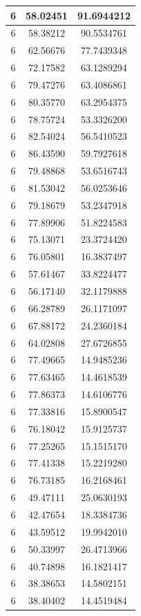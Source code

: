 \documentclass[
]{book}
\begin{document}
\begin{tabular}{c|c|c}
\hline
6 & 58.02451 & 91.6944212\\
\hline
6 & 58.38212 & 90.5534761\\
\hline
6 & 62.56676 & 77.7439348\\
\hline
6 & 72.17582 & 63.1289294\\
\hline
6 & 79.47276 & 63.4086861\\
\hline
6 & 80.35770 & 63.2954375\\
\hline
6 & 78.75724 & 53.3326200\\
\hline
6 & 82.54024 & 56.5410523\\
\hline
6 & 86.43590 & 59.7927618\\
\hline
6 & 79.48868 & 53.6516743\\
\hline
6 & 81.53042 & 56.0253646\\
\hline
6 & 79.18679 & 53.2347918\\
\hline
6 & 77.89906 & 51.8224583\\
\hline
6 & 75.13071 & 23.3724420\\
\hline
6 & 76.05801 & 16.3837497\\
\hline
6 & 57.61467 & 33.8224477\\
\hline
6 & 56.17140 & 32.1179888\\
\hline
6 & 66.28789 & 26.1171097\\
\hline
6 & 67.88172 & 24.2360184\\
\hline
6 & 64.02808 & 27.6726855\\
\hline
6 & 77.49665 & 14.9485236\\
\hline
6 & 77.63465 & 14.4618539\\
\hline
6 & 77.86373 & 14.6106776\\
\hline
6 & 77.33816 & 15.8900547\\
\hline
6 & 76.18042 & 15.9125737\\
\hline
6 & 77.25265 & 15.1515170\\
\hline
6 & 77.41338 & 15.2219280\\
\hline
6 & 76.73185 & 16.2168461\\
\hline
6 & 49.47111 & 25.0630193\\
\hline
6 & 42.47654 & 18.3384736\\
\hline
6 & 43.59512 & 19.9942010\\
\hline
6 & 50.33997 & 26.4713966\\
\hline
6 & 40.74898 & 16.1821417\\
\hline
6 & 38.38653 & 14.5802151\\
\hline
6 & 38.40402 & 14.4519484\\

\end{tabular}
\end{document}

